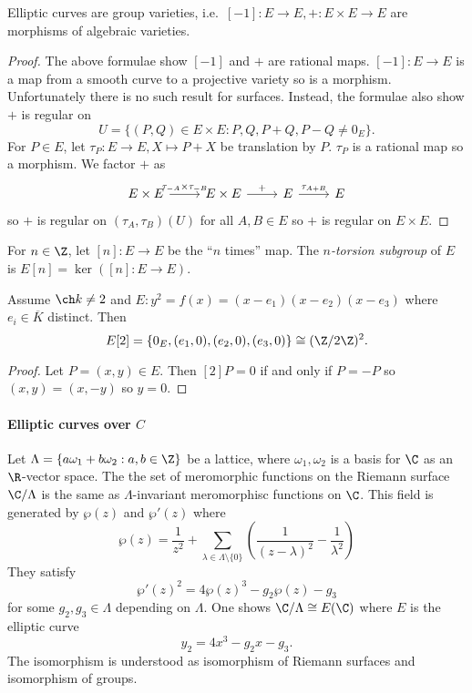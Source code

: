 \documentclass[a4paper]{article}
\theoremstyle{definition}
\theoremstyle{theorem}
\begin{document}
\begin{theorem}
  Elliptic curves are group varieties, i.e.\ \([-1]: E \to E, +: E \times E \to E\) are morphisms of algebraic varieties.
\end{theorem}

\begin{proof}
  The above formulae show \([-1]\) and \(+\) are rational maps. \([-1]: E \to E\) is a map from a smooth curve to a projective variety so is a morphism. Unfortunately there is no such result for surfaces. Instead, the formulae also show \(+\) is regular on
  \[
    U = \{(P, Q) \in E \times E: P, Q, P + Q, P - Q \neq 0_E\}.
  \]
  For \(P \in E\), let \(\tau_P: E \to E, X \mapsto P + X\) be translation by \(P\). \(\tau_P\) is a rational map so a morphism. We factor \(+\) as
  \[
    \begin{tikzcd}
      E \times E \ar[r, "\tau_{-A} \times \tau_{-B}"] & E \times E \ar[r, "+"] & E \ar[r, "\tau_{A + B}"] & E
    \end{tikzcd}
  \]
  so \(+\) is regular on \((\tau_A, \tau_B)(U)\) for all \(A, B \in E\) so \(+\) is regular on \(E \times E\).
\end{proof}

\begin{definition}
  For \(n \in \Z\), let \([n]: E \to E\) be the ``\(n\) times'' map. The \emph{\(n\)-torsion subgroup} of \(E\) is \(E[n] = \ker([n]: E \to E)\).
\end{definition}

\begin{lemma}
  Assume \(\ch k \neq 2\) and \(E: y^2 = f(x) = (x - e_1)(x - e_2)(x - e_3)\) where \(e_i \in \overline K\) distinct. Then
  \[
    E[2] = \{0_E, (e_1, 0), (e_2, 0), (e_3, 0)\} \cong (\Z/2\Z)^2.
  \]
\end{lemma}

\begin{proof}
  Let \(P = (x, y) \in E\). Then \([2] P = 0\) if and only if \(P = - P\) so \((x, y) = (x, -y)\) so \(y = 0\).
\end{proof}

\paragraph{Elliptic curves over \(C\)}

Let \(\Lambda = \{a \omega_1 + b \omega_2: a, b \in \Z\}\) be a lattice, where \(\omega_1, \omega_2\) is a basis for \(\C\) as an \(\R\)-vector space. The the set of meromorphic functions on the Riemann surface \(\C/\Lambda\) is the same as \(\Lambda\)-invariant meromorphisc functions on \(\C\). This field is generated by \(\wp(z)\) and \(\wp'(z)\) where
\[
  \wp(z) = \frac{1}{z^2} + \sum_{\lambda \in \Lambda \setminus \{0\}} \left(\frac{1}{(z - \lambda)^2} - \frac{1}{\lambda^2}\right)
\]
They satisfy
\[
  \wp'(z)^2 = 4 \wp(z)^3 - g_2 \wp(z) - g_3
\]
for some \(g_2, g_3 \in \Lambda\) depending on \(\Lambda\). One shows \(\C/\Lambda \cong E(\C)\) where \(E\) is the elliptic curve
\[
  y_2 = 4x^3 - g_2x - g_3.
\]
The isomorphism is understood as isomorphism of Riemann surfaces and isomorphism of groups.
\end{document}
